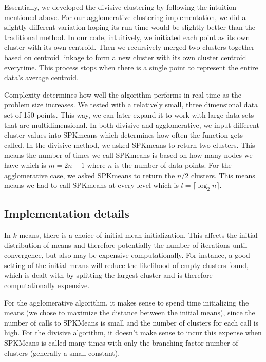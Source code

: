 \documentclass[../tech_report_1.tex]{subfiles}
\begin{document}
Essentially, we developed the divisive clustering by following the
intuition mentioned above. For our agglomerative clustering implementation,
we did a slightly different variation hoping its run time would be
slightly better than the traditional method. In our code, intuitively,
we initiated each point as its own cluster with its own centroid.
Then we recursively merged two clusters together based on centroid
linkage to form a new cluster with its own cluster centroid everytime.
This process stops when there is a single point to represent the entire
data's average centroid.

Complexity determines how well the algorithm performs in real time
as the problem size increases. We tested with a relatively small,
three dimensional data set of 150 points. This way, we can later expand
it to work with large data sets that are multidimensional. In both 
divisive and agglomerative, we input different cluster values into
SPKmeans which determines how often the function gets called. In the
divisive method, we asked SPKmeans to return two clusters.
This means the number of times we call SPKmeans
is based on how many nodes we have which is $m=2n-1$ where $n$ is
the number of data points. For the agglomerative case, we asked SPKmeans to
return the $n/2$ clusters. This means means we had to call SPKmeans
at every level which is $l=\lceil\log_{2}n\rceil$.

\subsection*{Implementation details}

In $k$-means, there is a choice of initial mean initialization. This affects the initial distribution of means and therefore potentially the number of iterations until convergence, but also may be expensive computationally. For instance, a good setting of the initial means will reduce the likelihood of empty clusters found, which is dealt with by splitting the largest cluster and is therefore computationally expensive.

For the agglomerative algorithm, it makes sense to spend time initializing the means (we chose to maximize the distance between the initial means), since the number of calls to SPKMeans is small and the number of clusters for each call is high. For the divisive algorithm, it doesn't make sense to incur this expense when SPKMeans is called many times with only the branching-factor number of clusters (generally a small constant).
\end{document}
